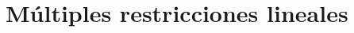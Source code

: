 \documentclass[t, compress, spanish, aspectratio=169]{beamer}
\begin{document}
%    
%   
\section{M\'ultiples restricciones lineales}

\end{document}

